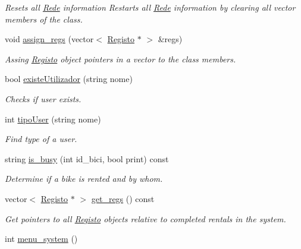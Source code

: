 \begin{DoxyCompactItemize}
\begin{DoxyCompactList}\small\item\em Resets all \hyperlink{class_rede}{Rede} information Restarts all \hyperlink{class_rede}{Rede} information by clearing all vector members of the class. \end{DoxyCompactList}\item 
void \hyperlink{class_rede_ad38e26e59622727f978b995f6b9955c5}{assign\+\_\+regs} (vector$<$ \hyperlink{class_registo}{Registo} $\ast$ $>$ \&regs)
\begin{DoxyCompactList}\small\item\em Assing \hyperlink{class_registo}{Registo} object pointers in a vector to the class members. \end{DoxyCompactList}\item 
bool \hyperlink{class_rede_a42b5a88380e63b78e5c99894aee0dfbc}{existe\+Utilizador} (string nome)
\begin{DoxyCompactList}\small\item\em Checks if user exists. \end{DoxyCompactList}\item 
int \hyperlink{class_rede_ac74ae338ed2ddb5b8f94c9ed33e172ef}{tipo\+User} (string nome)
\begin{DoxyCompactList}\small\item\em Find type of a user. \end{DoxyCompactList}\item 
string \hyperlink{class_rede_aba033af0c2cd9a4f70ca1f9459a6a3ee}{is\+\_\+busy} (int id\+\_\+bici, bool print) const 
\begin{DoxyCompactList}\small\item\em Determine if a bike is rented and by whom. \end{DoxyCompactList}\item 
vector$<$ \hyperlink{class_registo}{Registo} $\ast$ $>$ \hyperlink{class_rede_a0862364a4ce27c157b2b756184526748}{get\+\_\+regs} () const 
\begin{DoxyCompactList}\small\item\em Get pointers to all \hyperlink{class_registo}{Registo} objects relative to completed rentals in the system. \end{DoxyCompactList}\item 
\hypertarget{class_rede_a906023ec85b2043b4610e627951e93b8}{int \hyperlink{class_rede_a906023ec85b2043b4610e627951e93b8}{menu\+\_\+system} ()}\label{class_rede_a906023ec85b2043b4610e627951e93b8}


\end{DoxyCompactItemize}
